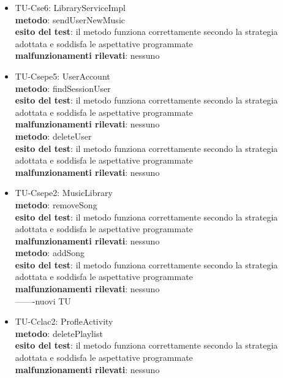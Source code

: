 \begin{itemize}
  \item TU-Cse6: LibraryServiceImpl\\
  \textbf{metodo}: sendUserNewMusic\\
  \textbf{esito del test}: il metodo funziona correttamente secondo la strategia
  adottata e soddisfa le aspettative programmate\\
  \textbf{malfunzionamenti rilevati}: nessuno\\
  
  \item TU-Csepe5: UserAccount\\
  \textbf{metodo}: findSessionUser\\
  \textbf{esito del test}: il metodo funziona correttamente secondo la strategia
  adottata e soddisfa le aspettative programmate\\
  \textbf{malfunzionamenti rilevati}: nessuno\\
  
  \textbf{metodo}: deleteUser\\
  \textbf{esito del test}: il metodo funziona correttamente secondo la strategia
  adottata e soddisfa le aspettative programmate\\
  \textbf{malfunzionamenti rilevati}: nessuno\\
  
  \item TU-Csepe2: MusicLibrary\\
  \textbf{metodo}: removeSong\\
  \textbf{esito del test}: il metodo funziona correttamente secondo la strategia
  adottata e soddisfa le aspettative programmate\\
  \textbf{malfunzionamenti rilevati}: nessuno\\
  
  \textbf{metodo}: addSong\\
  \textbf{esito del test}: il metodo funziona correttamente secondo la strategia
  adottata e soddisfa le aspettative programmate\\
  \textbf{malfunzionamenti rilevati}: nessuno\\
  
  -------nuovi TU\\
  \item TU-Cclac2: ProfleActivity\\
  \textbf{metodo}: deletePlaylist\\
  \textbf{esito del test}: il metodo funziona correttamente secondo la strategia
  adottata e soddisfa le aspettative programmate\\
  \textbf{malfunzionamenti rilevati}: nessuno\\
  

\end{itemize}

